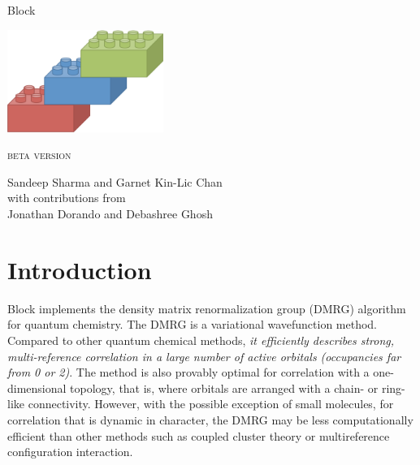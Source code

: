 \documentclass[letterpaper,12pt,aps, pra]{revtex4-1}
\begin{document}
\vfill
{\LARGE
  \begin{center}
{Block}
\end{center}
}
\vspace{0.5in}
\begin{center}{\includegraphics[width=2in]{block_logo}}\\
\end{center}
\vspace{0.5in}
\begin{center}
{\Large \textsc{beta version}}
\end{center}
\vspace{1in}

{\large
\begin{center}
Sandeep Sharma and Garnet Kin-Lic Chan\\
\vspace{0.2in}
with contributions from\\
\vspace{0.2in}
Jonathan Dorando and Debashree Ghosh
\end{center}
}
\vspace{1in}

\thispagestyle{empty}
\newpage

\tableofcontents
\newpage
{}
\section{Introduction}

Block implements the density matrix renormalization group (DMRG) algorithm for quantum chemistry. 
The DMRG is a variational wavefunction method. Compared to other quantum chemical methods, 
{\it it  efficiently describes strong, multi-reference correlation in
 a large number of active orbitals (occupancies far from 0 or 2)}.
The method is also provably optimal for correlation with a one-dimensional topology, that is,
where orbitals are arranged with a chain- or ring-like connectivity.
However, with the possible exception of small molecules, for correlation that is dynamic in character, the DMRG may be less computationally
efficient than other methods such as coupled cluster theory or multireference configuration interaction.
\end{document}
